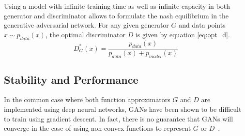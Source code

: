 Using a model with infinite training time as well as infinite capacity in both generator and discriminator allows to formulate the nash equilibrium in the generative adversarial network.
For any given generator $G$ and data points $x \sim p_{data}(x)$, the optimal discriminator $D$ is given by equation \ref{eq:opt_d}.
\begin{equation}
  \label{eq:opt_d}
  D_G^*(x) = \frac{p_{data}(x)}{p_{data}(x) + p_{model}(x)}
\end{equation}



\newpage

\subsection{Stability and Performance}
\label{sub:gan_stability}
In the common case where both function approximators $G$ and $D$ are implemented using deep neural networks, GANs have been shown to be difficult to train using gradient descent.
In fact, there is no guarantee that GANs will converge in the case of using non-convex functions to represent $G$ or $D$~\cite[p.~700-701]{deeplearning:2016}.

